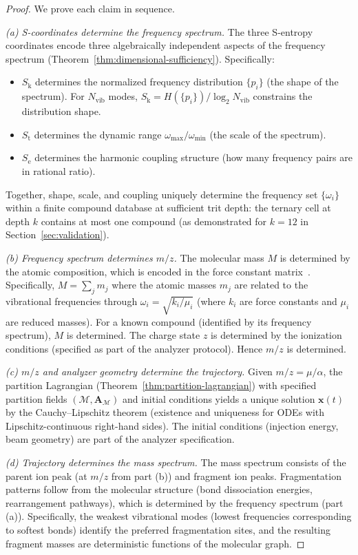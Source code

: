 \documentclass[11pt,twocolumn,a4paper]{article}
\theoremstyle{definition}
\theoremstyle{remark}
\newcommand{\Sk}{S_{\mathrm{k}}}
\newcommand{\St}{S_{\mathrm{t}}}
\newcommand{\Se}{S_{\mathrm{e}}}
\newcommand{\Depth}{\mathcal{M}}
\newcommand{\Nvib}{N_{\mathrm{vib}}}
\newcommand{\partinert}{\mu}
\newcommand{\Apartition}{\mathbf{A}_{\mathcal{M}}}
\begin{document}
\begin{proof}
We prove each claim in sequence.

\emph{(a) S-coordinates determine the frequency spectrum.} The three S-entropy coordinates encode three algebraically independent aspects of the frequency spectrum (Theorem~\ref{thm:dimensional-sufficiency}). Specifically:
\begin{itemize}
  \item $\Sk$ determines the normalized frequency distribution $\{p_i\}$ (the shape of the spectrum). For $\Nvib$ modes, $\Sk = H(\{p_i\})/\log_2\Nvib$ constrains the distribution shape.
  \item $\St$ determines the dynamic range $\omega_{\max}/\omega_{\min}$ (the scale of the spectrum).
  \item $\Se$ determines the harmonic coupling structure (how many frequency pairs are in rational ratio).
\end{itemize}
Together, shape, scale, and coupling uniquely determine the frequency set $\{\omega_i\}$ within a finite compound database at sufficient trit depth: the ternary cell at depth $k$ contains at most one compound (as demonstrated for $k=12$ in Section~\ref{sec:validation}).

\emph{(b) Frequency spectrum determines $m/z$.} The molecular mass $M$ is determined by the atomic composition, which is encoded in the force constant matrix~\citep{wilson1955}. Specifically, $M = \sum_j m_j$ where the atomic masses $m_j$ are related to the vibrational frequencies through $\omega_i = \sqrt{k_i/\mu_i}$ (where $k_i$ are force constants and $\mu_i$ are reduced masses). For a known compound (identified by its frequency spectrum), $M$ is determined. The charge state $z$ is determined by the ionization conditions (specified as part of the analyzer protocol). Hence $m/z$ is determined.

\emph{(c) $m/z$ and analyzer geometry determine the trajectory.} Given $m/z = \partinert/\alpha$, the partition Lagrangian (Theorem~\ref{thm:partition-lagrangian}) with specified partition fields $(\Depth, \Apartition)$ and initial conditions yields a unique solution $\mathbf{x}(t)$ by the Cauchy--Lipschitz theorem (existence and uniqueness for ODEs with Lipschitz-continuous right-hand sides). The initial conditions (injection energy, beam geometry) are part of the analyzer specification.

\emph{(d) Trajectory determines the mass spectrum.} The mass spectrum consists of the parent ion peak (at $m/z$ from part (b)) and fragment ion peaks. Fragmentation patterns follow from the molecular structure (bond dissociation energies, rearrangement pathways), which is determined by the frequency spectrum (part (a)). Specifically, the weakest vibrational modes (lowest frequencies corresponding to softest bonds) identify the preferred fragmentation sites, and the resulting fragment masses are deterministic functions of the molecular graph.
\end{proof}
\end{document}

